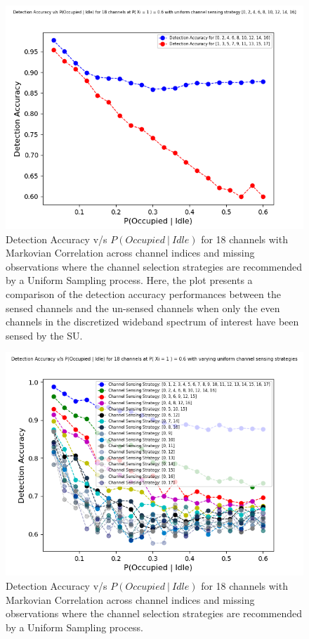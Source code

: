 \documentclass[12pt, draftcls, onecolumn]{IEEEtran}
\begin{document}
\begin{figure}[t]
\includegraphics[width=1.0\textwidth]{Uniform_Channel_Sensing_1.png}
\caption{Detection Accuracy v/s $P(Occupied\ |\ Idle)$ for 18 channels with Markovian Correlation across channel indices and missing observations where the channel selection strategies are recommended by a Uniform Sampling process. Here, the plot presents a comparison of the detection accuracy performances between the sensed channels and the un-sensed channels when only the even channels in the discretized wideband spectrum of interest have been sensed by the SU.}
\label{fig:mesh4}
\centering
\end{figure}
\begin{figure}[t]
\includegraphics[width=1.0\textwidth]{Uniform_Channel_Sensing.png}
\caption{Detection Accuracy v/s $P(Occupied\ |\ Idle)$ for 18 channels with Markovian Correlation across channel indices and missing observations where the channel selection strategies are recommended by a Uniform Sampling process.}
\label{fig:mesh5}
\centering
\end{figure}
\end{document}
